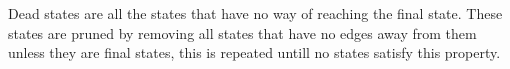 Dead states are all the states that have no way of reaching the final state.
These states are pruned by removing all states that have no edges away from them unless they are final states, this is repeated untill no states satisfy this property.


